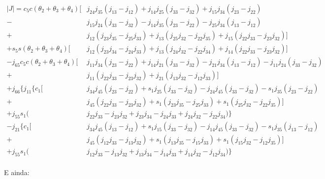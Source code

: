 \begin{align*}
    |J| = c_5c(\theta_2+\theta_3+\theta_4)[&j_{24}j_{35}(j_{13}-j_{12})+j_{14}j_{25}(j_{33}-j_{32})+j_{15}j_{34}(j_{23}-j_{22}) \\
                                          -&j_{15}j_{24}(j_{33}-j_{32})-j_{14}j_{35}(j_{23}-j_{22})-j_{25}j_{34}(j_{13}-j_{12}) \\
                                          +&j_{12}(j_{23}j_{35}-j_{25}j_{33})+j_{13}(j_{25}j_{32}-j_{22}j_{35})+j_{15}(j_{22}j_{33}-j_{23}j_{32})] \\
         +s_5s(\theta_2+\theta_3+\theta_4)[&j_{12}(j_{23}j_{34}-j_{24}j_{33})+j_{13}(j_{24}j_{32}-j_{22}j_{34})+j_{14}(j_{22}j_{33}-j_{23}j_{32})] \\
    -j_{65}c_5c(\theta_2+\theta_3+\theta_4)[&j_{11}j_{34}(j_{23}-j_{22})+j_{14}j_{21}(j_{33}-j_{32})-j_{21}j_{34}(j_{13}-j_{12})-j_{11}j_{24}(j_{33}-j_{32}) \\
                                          +&j_{11}(j_{22}j_{33}-j_{23}j_{32})+j_{21}(j_{13}j_{32}-j_{12}j_{33})] \\ 
    +j_{66}\{j_{11}\{c_1[&j_{34}j_{45}(j_{23}-j_{22})+s_1j_{25}(j_{33}-j_{32})-j_{24}j_{45}(j_{33}-j_{32})-s_1j_{35}(j_{23}-j_{22}) \\
                        +&j_{45}(j_{22}j_{33}-j_{23}j_{32}) + s_1(j_{23}j_{35}-j_{25}j_{33}) + s_1(j_{25}j_{32}-j_{22}j_{35})] \\
                +j_{55}s_1(&j_{22}j_{33}-j_{23}j_{32}+j_{23}j_{34}-j_{24}j_{33}+j_{24}j_{32}-j_{22}j_{34})\} \\
            -j_{21}\{c_1[&j_{34}j_{45}(j_{13}-j_{12})+s_1j_{15}(j_{33}-j_{32})-j_{14}j_{45}(j_{33}-j_{32})-s_1j_{35}(j_{13}-j_{12}) \\
                        +&j_{45}(j_{12}j_{33}-j_{13}j_{32}) + s_1(j_{13}j_{35}-j_{15}j_{33}) + s_1(j_{15}j_{32}-j_{12}j_{35})] \\
                +j_{55}s_1(&j_{12}j_{33}-j_{13}j_{32}+j_{13}j_{34}-j_{14}j_{33}+j_{14}j_{32}-j_{12}j_{34})\} \\            
\end{align*}

E ainda:

